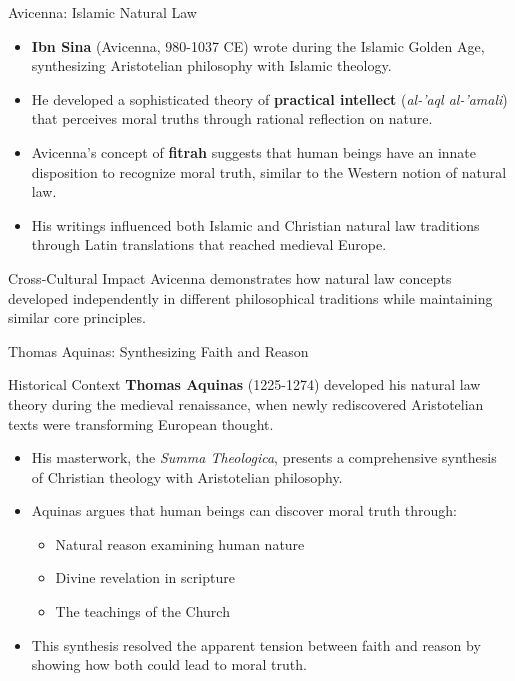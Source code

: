 \documentclass{beamer}
\begin{document}
\begin{frame}{Avicenna: Islamic Natural Law}
    \begin{itemize}
        \item \textbf{Ibn Sina} (Avicenna, 980-1037 CE) wrote during the Islamic Golden Age, synthesizing Aristotelian philosophy with Islamic theology.
        
        \item He developed a sophisticated theory of \textbf{practical intellect} (\textit{al-'aql al-'amali}) that perceives moral truths through rational reflection on nature.
        
        \item Avicenna's concept of \textbf{fitrah} suggests that human beings have an innate disposition to recognize moral truth, similar to the Western notion of natural law.
        
        \item His writings influenced both Islamic and Christian natural law traditions through Latin translations that reached medieval Europe.
    \end{itemize}
    
    \begin{alertblock}{Cross-Cultural Impact}
        Avicenna demonstrates how natural law concepts developed independently in different philosophical traditions while maintaining similar core principles.
    \end{alertblock}
\end{frame}

\begin{frame}{Thomas Aquinas: Synthesizing Faith and Reason}
    \begin{alertblock}{Historical Context}
        \textbf{Thomas Aquinas} (1225-1274) developed his natural law theory during the medieval renaissance, when newly rediscovered Aristotelian texts were transforming European thought.
    \end{alertblock}
    
    \begin{itemize}
        \item His masterwork, the \textit{Summa Theologica}, presents a comprehensive synthesis of Christian theology with Aristotelian philosophy.
        
        \item Aquinas argues that human beings can discover moral truth through:
        \begin{itemize}
            \item Natural reason examining human nature
            \item Divine revelation in scripture
            \item The teachings of the Church
        \end{itemize}
        
        \item This synthesis resolved the apparent tension between faith and reason by showing how both could lead to moral truth.
    \end{itemize}
\end{frame}
\end{document}
